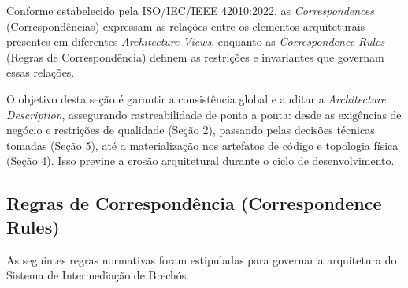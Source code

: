﻿\documentclass[12pt,a4paper]{article}
\begin{document}
Conforme estabelecido pela ISO/IEC/IEEE 42010:2022, as \textit{Correspondences} (Correspondências) expressam as relações entre os elementos arquiteturais presentes em diferentes \textit{Architecture Views}, enquanto as \textit{Correspondence Rules} (Regras de Correspondência) definem as restrições e invariantes que governam essas relações. 

O objetivo desta seção é garantir a consistência global e auditar a \textit{Architecture Description}, assegurando rastreabilidade de ponta a ponta: desde as exigências de negócio e restrições de qualidade (Seção 2), passando pelas decisões técnicas tomadas (Seção 5), até a materialização nos artefatos de código e topologia física (Seção 4). Isso previne a erosão arquitetural durante o ciclo de desenvolvimento.

\subsection{Regras de Correspondência (Correspondence Rules)}

As seguintes regras normativas foram estipuladas para governar a arquitetura do Sistema de Intermediação de Brechós.
\end{document}
